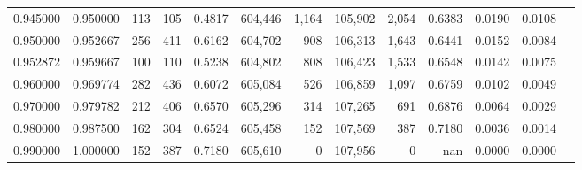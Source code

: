 \begin{tabular}{rrrrrrrrrrrrr}
0.945000 & 0.950000 &   113 & 105 &                                     0.4817 & 604,446 &   1,164 & 105,902 &   2,054 & 0.6383 & 0.0190 & 0.0108 \\
0.950000 & 0.952667 &   256 & 411 &                                     0.6162 & 604,702 &     908 & 106,313 &   1,643 & 0.6441 & 0.0152 & 0.0084 \\
0.952872 & 0.959667 &   100 & 110 &                                     0.5238 & 604,802 &     808 & 106,423 &   1,533 & 0.6548 & 0.0142 & 0.0075 \\
0.960000 & 0.969774 &   282 & 436 &                                     0.6072 & 605,084 &     526 & 106,859 &   1,097 & 0.6759 & 0.0102 & 0.0049 \\
0.970000 & 0.979782 &   212 & 406 &                                     0.6570 & 605,296 &     314 & 107,265 &     691 & 0.6876 & 0.0064 & 0.0029 \\
0.980000 & 0.987500 &   162 & 304 &                                     0.6524 & 605,458 &     152 & 107,569 &     387 & 0.7180 & 0.0036 & 0.0014 \\
0.990000 & 1.000000 &   152 & 387 &                                     0.7180 & 605,610 &       0 & 107,956 &       0 &    nan & 0.0000 & 0.0000 \\
\bottomrule
\end{tabular}
